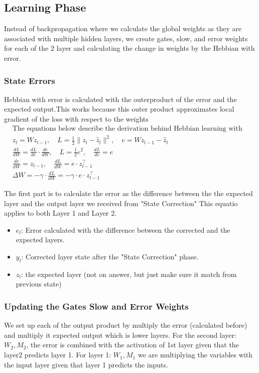 \documentclass{article}
\begin{document}
\subsection{Learning Phase}
\hspace*{.5cm}Instead of backpropagation where we calculate the global weights as they are associated with multiple hidden layers, we create gates, slow, and error weights for each of the 2 layer and calculating the change in weights by the Hebbian with error. 

\subsubsection{State Errors}
Hebbian with error is calculated with the outerproduct of the error and the expected output.This works because this outer product approximates local gradient of the loss with respect to the weights 
\begin{align*}
&\text{The equations below describe the derivation behind Hebbian learning with error:} \\[10pt]
&z_l = W z_{l-1}, \quad 
L = \frac{1}{2} \| z_l - \hat{z}_l \|^2, \quad 
e = W z_{l-1} - \hat{z}_l \\[10pt]
&\frac{dL}{dW} = \frac{dL}{de} \cdot \frac{de}{dW}, \quad 
L = \frac{1}{2} e^2, \quad 
\frac{dL}{de} = e \\[10pt]
&\frac{de}{dW} = z_{l-1}, \quad 
\frac{dL}{dW} = e \cdot z_{l-1}^\top \\[10pt]
&\Delta W = -\gamma \cdot \frac{dL}{dW} = -\gamma \cdot e \cdot z_{l-1}^\top
\end{align*}


The first part is to calculate the error as the difference between the the expected layer and the output layer we received from "State Correction" This equatio  applies to both Layer 1 and Layer 2. 
\begin{itemize}
    \item $e_l$: Error calculated with the difference between the corrected and the expected layers. 
    \item $y_l$: Corrected layer state after the "State Correction" phase. 
    \item $z_l$: the expected layer (not on answer, but just make sure it match from previous state)
\end{itemize}

\subsubsection{Updating the Gates Slow and Error Weights}
We set up each of the output product by multiply the error (calculated before) and multiply it expected output which is lower layers. For the second layer: \begin{math} W_2, M_2\end{math}, the error is combined with the activation of 1st layer given that the layer2 predicts layer 1. For layer 1: \begin{math} W_1, M_1\end{math} we are multiplying the variables with the input layer given that layer 1 predicts the inputs. 
\end{document}
